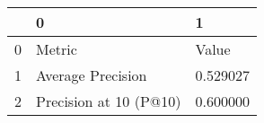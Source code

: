 \begin{tabular}{lll}
\toprule
 & 0 & 1 \\
\midrule
0 & Metric & Value \\
1 & Average Precision & 0.529027 \\
2 & Precision at 10 (P@10) & 0.600000 \\
\bottomrule
\end{tabular}
